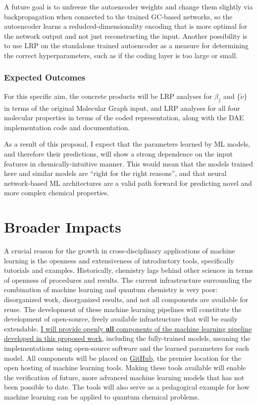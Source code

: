 \documentclass[12pt]{article}
\begin{document}
A future goal is to unfreeze the autoencoder weights and change them slightly via backpropagation when connected to the trained GC-based networks, so the autoencoder learns a redudced-dimensionality encoding that is more optimal for the network output and not just reconstructing the input. Another possibility is to use LRP on the standalone trained autoencoder as a measure for determining the correct hyperparameters, such as if the coding layer is too large or small.

\subsubsection{Expected Outcomes}
\label{sec:orgf1adead}

For this specific aim, the concrete products will be LRP analyses for \(\beta_{\parallel}\) and \(\{\tilde{\nu}\}\) in terms of the original Molecular Graph input, and LRP analyses for all four molecular properties in terms of the coded representation, along with the DAE implementation code and documentation.

As a result of this proposal, I expect that the parameters learned by ML models, and therefore their predictions, will show a strong dependence on the input features in chemically-intuitive manner. This would mean that the models trained here and similar models are ``right for the right reasons'', and that neural network-based ML architectures are a valid path forward for predicting novel and more complex chemical properties.

\section{Broader Impacts}
\label{sec:orgb14ae5b}

A crucial reason for the growth in cross-disciplinary applications of machine learning is the openness and extensiveness of introductory tools, specifically tutorials and examples. Historically, chemistry lags behind other sciences in terms of openness of procedures and results. The current infrastructure surrounding the combination of machine learning and quantum chemistry is very poor: disorganized work, disorganized results, and not all components are available for reuse. The development of these machine learning pipelines will constitute the development of open-source, freely available infrastructure that will be easily extendable. \uline{I will provide openly \textbf{all} components of the machine learning pipeline developed in this proposed work}, including the fully-trained models, meaning the implementations using open-source software and the learned parameters for each model. All components will be placed on \href{https://github.com/}{GitHub}, the premier location for the open hosting of machine learning tools. Making these tools available will enable the verification of future, more advanced machine learning models that has not been possible to date. The tools will also serve as a pedagogical example for how machine learning can be applied to quantum chemical problems.
\end{document}
